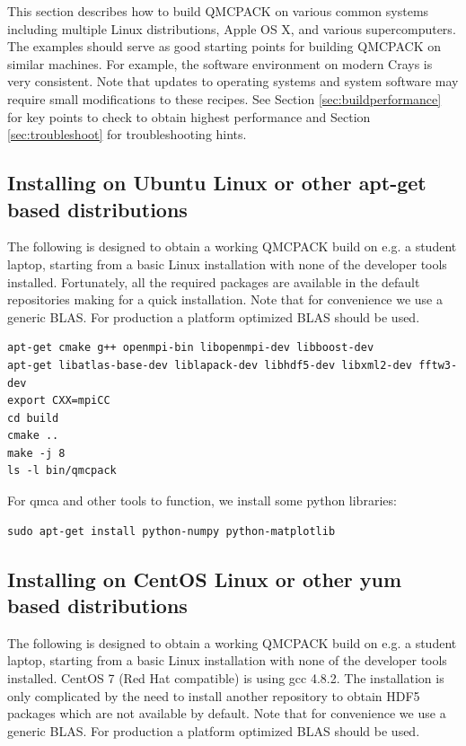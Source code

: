 This section describes how to build QMCPACK on various common systems
including multiple Linux distributions, Apple OS X, and various
supercomputers. The examples should serve as good starting points for
building QMCPACK on similar machines. For example, the software
environment on modern Crays is very consistent. Note that updates to
operating systems and system software may require small modifications
to these recipes. See Section \ref{sec:buildperformance} for key
points to check to obtain highest performance and
Section \ref{sec:troubleshoot} for troubleshooting hints.

\subsection{Installing on Ubuntu Linux or other apt-get based distributions}
\label{sec:buildubuntu}

The following is designed to obtain a working QMCPACK build on e.g. a
student laptop, starting from a basic Linux installation with none of
the developer tools installed. Fortunately, all the required packages
are available in the default repositories making for a quick
installation. Note that for convenience we use a generic BLAS. For
production a platform optimized BLAS should be used.

\verbatimfont{\footnotesize}
\begin{verbatim}
apt-get cmake g++ openmpi-bin libopenmpi-dev libboost-dev
apt-get libatlas-base-dev liblapack-dev libhdf5-dev libxml2-dev fftw3-dev
export CXX=mpiCC
cd build
cmake ..
make -j 8
ls -l bin/qmcpack
\end{verbatim}

For qmca and other tools to function, we install some python libraries:
\verbatimfont{\footnotesize}
\begin{verbatim}
sudo apt-get install python-numpy python-matplotlib
\end{verbatim}

\subsection{Installing on CentOS Linux or other yum based distributions}

The following is designed to obtain a working QMCPACK build on e.g. a
student laptop, starting from a basic Linux installation with none of
the developer tools installed. CentOS 7 (Red Hat compatible) is using
gcc 4.8.2. The installation is only complicated by the need to install
another repository to obtain HDF5 packages which are not available by
default. Note that for convenience we use a generic BLAS. For
production a platform optimized BLAS should be used.

